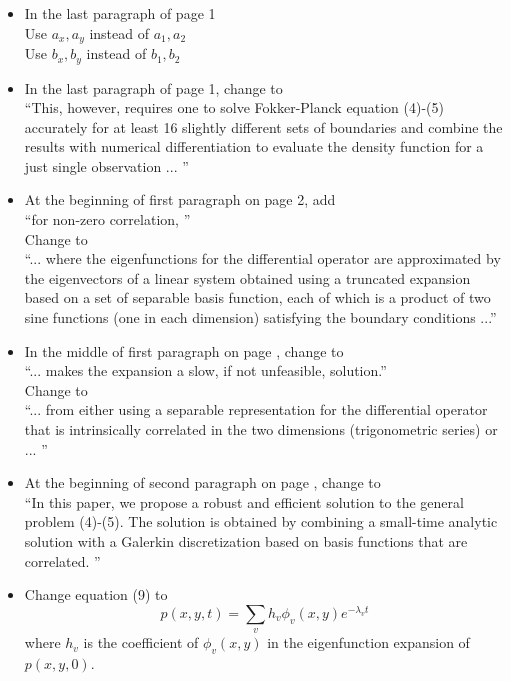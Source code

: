 \documentclass[12pt]{article}
\begin{document}
\begin{itemize}
\item In the last paragraph of page 1 \\
Use $a_x, a_y$ instead of $a_1, a_2$ \\
Use $b_x, b_y$ instead of $b_1, b_2$ 

\item In the last paragraph of page 1, change to  \\
``This, however, requires one to solve Fokker-Planck equation (4)-(5) accurately for at least 16
slightly different sets of boundaries and combine the results with numerical differentiation 
to evaluate the density function for a just single observation ... ''

\item At the beginning of first paragraph on page 2, add \\
``for non-zero correlation, '' \\

Change to \\
``... where the eigenfunctions for the differential operator are approximated
by the eigenvectors of a linear system obtained using a truncated expansion based on 
a set of separable basis function, each of which is a product of two sine functions (one in each dimension) satisfying the boundary conditions ...'' \\

\item In the middle of first paragraph on page , change to \\
 ``... makes the expansion a slow, if not unfeasible, solution.'' \\
 Change to \\
 ``... from either using a separable representation for the differential operator that is intrinsically 
 correlated in the two dimensions (trigonometric series) or ... ''

\item At the beginning of second paragraph on page , change to \\
``In this paper, we propose a robust and efficient solution to the general problem (4)-(5). The solution is obtained by combining a small-time analytic solution with a Galerkin discretization
based on basis functions that are correlated. ''

\item Change equation (9) to 
$$p(x,y,t) = \sum_v h_v \phi_v (x, y) e^{-\lambda_v t} $$
where $h_v$ is the coefficient of $\phi_v (x, y) $ in the eigenfunction expansion of $p(x, y, 0)$. 


\end{itemize}
\end{document}
